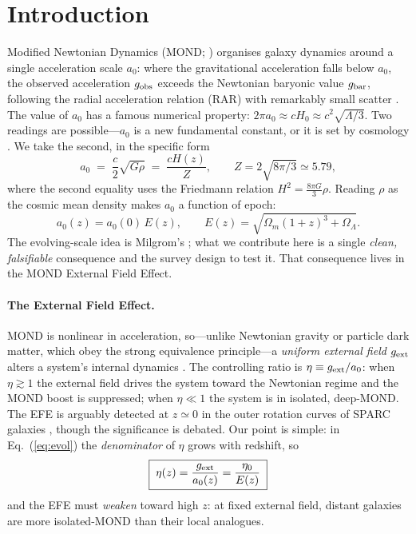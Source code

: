 \documentclass[11pt]{article}
\newcommand{\az}{a_0}
\newcommand{\gext}{g_{\rm ext}}
\newcommand{\gbar}{g_{\rm bar}}
\newcommand{\Ez}{E(z)}
\begin{document}
\section{Introduction}
Modified Newtonian Dynamics (MOND; \cite{Milgrom1983,Famaey2012}) organises galaxy
dynamics around a single acceleration scale $\az$: where the gravitational
acceleration falls below $\az$, the observed acceleration $g_{\rm obs}$ exceeds the
Newtonian baryonic value $\gbar$, following the radial acceleration relation (RAR)
with remarkably small scatter \cite{McGaugh2016,Lelli2017}. The value of $\az$ has a
famous numerical property: $2\pi\az\approx cH_0\approx c^2\sqrt{\Lambda/3}$. Two
readings are possible---$\az$ is a new fundamental constant, or it is set by
cosmology \cite{Milgrom2011,Milgrom2014}. We take the second, in the specific form
\begin{equation}
\az \;=\; \frac{c}{2}\sqrt{G\rho}\;=\;\frac{cH(z)}{Z},\qquad Z=2\sqrt{8\pi/3}\simeq5.79,
\label{eq:law}
\end{equation}
where the second equality uses the Friedmann relation $H^2=\tfrac{8\pi G}{3}\rho$.
Reading $\rho$ as the cosmic mean density makes $\az$ a function of epoch:
\begin{equation}
\az(z)=\az(0)\,\Ez,\qquad \Ez=\sqrt{\Omega_m(1+z)^3+\Omega_\Lambda}.
\label{eq:evol}
\end{equation}
The evolving-scale idea is Milgrom's \cite{Milgrom2014}; what we contribute here is a
single \emph{clean, falsifiable} consequence and the survey design to test it. That
consequence lives in the MOND External Field Effect.

\paragraph{The External Field Effect.}
MOND is nonlinear in acceleration, so---unlike Newtonian gravity or particle dark
matter, which obey the strong equivalence principle---a \emph{uniform external field}
$\gext$ alters a system's internal dynamics \cite{BekensteinMilgrom1984}. The
controlling ratio is $\eta\equiv\gext/\az$: when $\eta\gtrsim1$ the external field
drives the system toward the Newtonian regime and the MOND boost is suppressed; when
$\eta\ll1$ the system is in isolated, deep-MOND. The EFE is arguably detected at
$z\simeq0$ in the outer rotation curves of SPARC galaxies \cite{Chae2020}, though the
significance is debated. Our point is simple: in Eq.~(\ref{eq:evol}) the
\emph{denominator} of $\eta$ grows with redshift, so
\begin{equation}
\boxed{\;\eta(z)=\frac{\gext}{\az(z)}=\frac{\eta_0}{\Ez}\;}
\label{eq:efe}
\end{equation}
and the EFE must \emph{weaken} toward high $z$: at fixed external field, distant
galaxies are more isolated-MOND than their local analogues.
\end{document}
